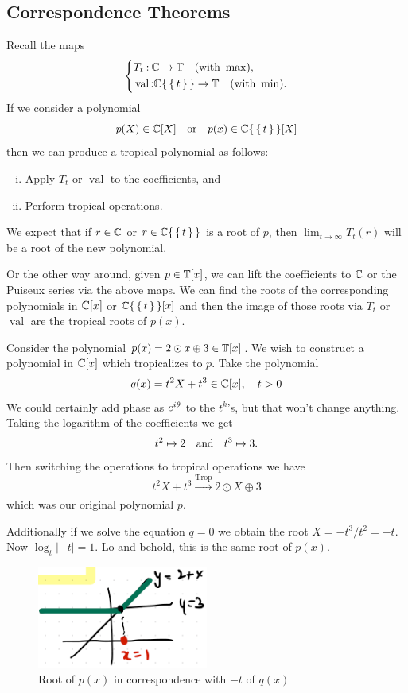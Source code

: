 \documentclass[12pt]{memoir}
\DeclareMathOperator{\val}{val}
\DeclareMathOperator{\Trop}{Trop}
\theoremstyle{definition}
\begin{document}
\subsection{Correspondence Theorems}
Recall the maps
$$
\left\lbrace 
\begin{aligned}
    &T_t\: \bC\to\bT\quad(\text{with }\max),\\
    &\val\: \bC\set{\set{t}}\to\bT\quad(\text{with }\min).
\end{aligned}
\right.
$$
If we consider a polynomial 
$$p(X)\in\mathbb{C}[X]\quad\text{or}\quad p(x)\in\mathbb{C}\{\,\{\,t\,\}\,\}[X]$$
then we can produce a tropical polynomial as follows:

\begin{enumerate}[i.]
    \item Apply $T_t$ or $\val$ to the coefficients, and
    \item Perform tropical operations.
\end{enumerate}

We expect that if $r\in\mathbb{C}$ or $r\in\mathbb{C}\{\,\{\,t\,\}\,\}$ is a root of $p$, then $\lim_{t\to\infty}T_t(r)$ will be a root of the new polynomial.\par
Or the other way around, given $p\in\mathbb{T}[x]$, we can lift the coefficients to $\mathbb{C}$ or the Puiseux series via the above maps. We can find the roots of the corresponding polynomials in $\mathbb{C}[x]$ or $\mathbb{C}\{\,\{\,t\,\}\,\}[x]$ and then the image of those roots via $T_t$ or $\val$ are the tropical roots of $p(x)$.

\begin{Ex}
    Consider the polynomial $p(x)=2\odot x\oplus3\in\mathbb{T}[x]$. We wish to construct a polynomial in $\mathbb{C}[x]$ which tropicalizes to $p$. Take the polynomial 
    $$q(x)=t^2X+t^3\in\mathbb{C}[x],\quad t>0$$ 
    We could certainly add phase as $e^{i\theta}$ to the $t^k$'s, but that won't change anything. Taking the logarithm of the coefficients we get 
    $$t^2\mapsto 2\quad\text{and}\quad t^3\mapsto 3.$$ 
    Then switching the operations to tropical operations we have
    $$t^2X+t^3\xrightarrow[]{\Trop}2\odot X\oplus 3$$ 
    which was our original polynomial $p$.\par 
    Additionally if we solve the equation $q=0$ we obtain the root $X=-t^3/t^2=-t$. Now $\log_t|-t|=1$. Lo and behold, this is the same root of $p(x)$. 
    \begin{figure}[h!]
        \centering
        \includegraphics[width=0.5\textwidth]{figs/fig4-4CorrespondenceRoots1Example.png}
        \caption{Root of $p(x)$ in correspondence with $-t$ of $q(x)$}
        \label{fig:4.4-CorrespondenceRoots1Example}
    \end{figure}
\end{Ex}
\end{document}

